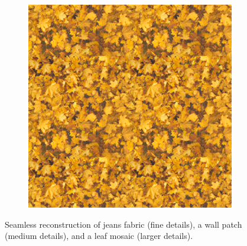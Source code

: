\begin{figure}[h]
\begin{subfigure}[b]{0.32\textwidth}
    \end{subfigure}
    \begin{subfigure}[b]{0.32\textwidth}
        \centering
        \includegraphics[width=\textwidth]{img/ch6/extrapolation-leaves.png}
    \end{subfigure}
    \caption{Seamless reconstruction of jeans fabric (fine details), a wall patch (medium details), and a leaf mosaic (larger details).}
    \label{f:seamless_examples}
\end{figure}





